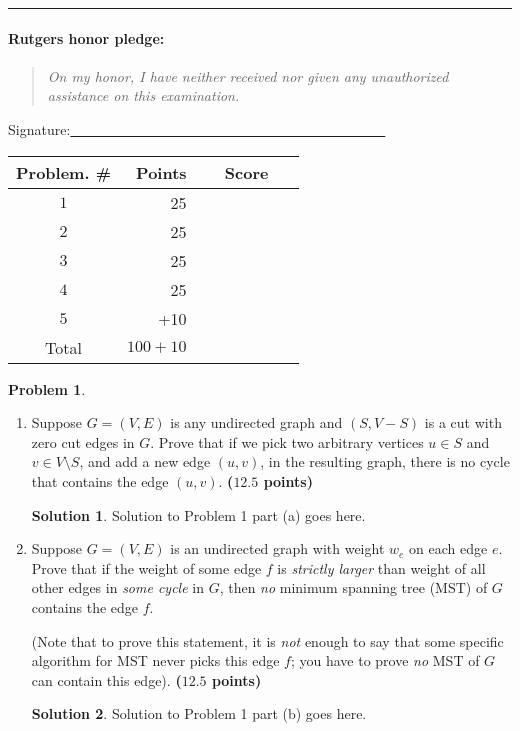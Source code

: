 \documentclass{article}
\theoremstyle{definition}
\newtheorem{problem}{Problem}
\def\fline{\rule{0.75\linewidth}{0.5pt}}
\newcommand{\finishline}{\vspace{-15pt}\begin{center}\fline\end{center}}
\newtheorem*{solution*}{Solution}
\newenvironment{solution}{\begin{solution*}}{{} \end{solution*}}
\newcommand{\grade}[1]{\hfill{\textbf{($\mathbf{#1}$ points)}}}
\begin{document}
\finishline

\paragraph{Rutgers honor pledge:} 

\begin{quote}
\emph{On my honor, I have neither received nor given any unauthorized assistance on this
examination.} 
\end{quote}
\hfill{Signature:\underline{~~~~~~~~~~~~~~~~~~~~~~~~~~~~~~~~~~~~~~~~~~~~~}}

\bigskip

\begin{center}
\begin{tabular}{|c|r|c|}
\hline
Problem. \# & Points & Score \\ \hline\hline
$1$ & 25 & ~~~~~~~~~~~\\  \hline
$2$ & 25 & \\ \hline
$3$ & 25 & \\ \hline
$4$ & 25 & \\ \hline
$5$ & +10 & \\ \hline
Total & $100 + 10$ & \\ \hline
\end{tabular}
\end{center}

\newpage

\begin{problem}\label{basics}~
\begin{enumerate}[label=(\alph*)]
	\item Suppose $G=(V,E)$ is any undirected graph and $(S,V-S)$ is a cut with zero cut edges in $G$. Prove that if we pick two arbitrary vertices $u \in S$ and $v \in V \setminus S$, and add a new edge $(u,v)$, in the resulting graph, there is no cycle that contains the edge $(u,v)$. 
	\grade{12.5}

\begin{solution}
	Solution to Problem 1 part (a) goes here. 
\end{solution}

	\newpage
	\item Suppose $G = (V,E)$ is an undirected graph with weight $w_e$ on each edge $e$. Prove that if the weight of some edge $f$ is \emph{strictly larger} than weight of  all other edges in \emph{some cycle} in $G$, then \emph{no} minimum spanning tree (MST) of $G$ contains the edge $f$. 
	
	(Note that to prove this statement, it is \emph{not} enough
	to say that some specific algorithm for MST never picks this edge $f$; you have to prove \emph{no} MST of $G$ can contain this edge). 
	 \grade{12.5}
	
	
\begin{solution}
	Solution to Problem 1 part (b) goes here. 
\end{solution}
 
	
\end{enumerate}
\end{problem}
\end{document}
